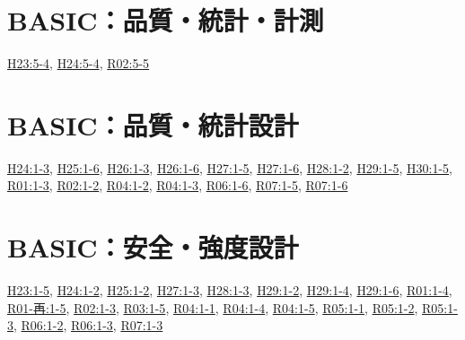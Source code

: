 \section{BASIC：品質・統計・計測}
\hyperref[q:h23-reg-basic-5-4]{H23:5-4}, \hyperref[q:h24-reg-basic-5-4]{H24:5-4}, \hyperref[q:r02-reg-basic-5-5]{R02:5-5}
\section{BASIC：品質・統計設計}
\hyperref[q:h24-reg-basic-1-3]{H24:1-3}, \hyperref[q:h25-reg-basic-1-6]{H25:1-6}, \hyperref[q:h26-reg-basic-1-3]{H26:1-3}, \hyperref[q:h26-reg-basic-1-6]{H26:1-6}, \hyperref[q:h27-reg-basic-1-5]{H27:1-5}, \hyperref[q:h27-reg-basic-1-6]{H27:1-6}, \hyperref[q:h28-reg-basic-1-2]{H28:1-2}, \hyperref[q:h29-reg-basic-1-5]{H29:1-5}, \hyperref[q:h30-reg-basic-1-5]{H30:1-5}, \hyperref[q:r01-reg-basic-1-3]{R01:1-3}, \hyperref[q:r02-reg-basic-1-2]{R02:1-2}, \hyperref[q:r04-reg-basic-1-2]{R04:1-2}, \hyperref[q:r04-reg-basic-1-3]{R04:1-3}, \hyperref[q:r06-reg-basic-1-6]{R06:1-6}, \hyperref[q:r07-reg-basic-1-5]{R07:1-5}, \hyperref[q:r07-reg-basic-1-6]{R07:1-6}
\section{BASIC：安全・強度設計}
\hyperref[q:h23-reg-basic-1-5]{H23:1-5}, \hyperref[q:h24-reg-basic-1-2]{H24:1-2}, \hyperref[q:h25-reg-basic-1-2]{H25:1-2}, \hyperref[q:h27-reg-basic-1-3]{H27:1-3}, \hyperref[q:h28-reg-basic-1-3]{H28:1-3}, \hyperref[q:h29-reg-basic-1-2]{H29:1-2}, \hyperref[q:h29-reg-basic-1-4]{H29:1-4}, \hyperref[q:h29-reg-basic-1-6]{H29:1-6}, \hyperref[q:r01-reg-basic-1-4]{R01:1-4}, \hyperref[q:r01-ret-basic-1-5]{R01-再:1-5}, \hyperref[q:r02-reg-basic-1-3]{R02:1-3}, \hyperref[q:r03-reg-basic-1-5]{R03:1-5}, \hyperref[q:r04-reg-basic-1-1]{R04:1-1}, \hyperref[q:r04-reg-basic-1-4]{R04:1-4}, \hyperref[q:r04-reg-basic-1-5]{R04:1-5}, \hyperref[q:r05-reg-basic-1-1]{R05:1-1}, \hyperref[q:r05-reg-basic-1-2]{R05:1-2}, \hyperref[q:r05-reg-basic-1-3]{R05:1-3}, \hyperref[q:r06-reg-basic-1-2]{R06:1-2}, \hyperref[q:r06-reg-basic-1-3]{R06:1-3}, \hyperref[q:r07-reg-basic-1-3]{R07:1-3}
